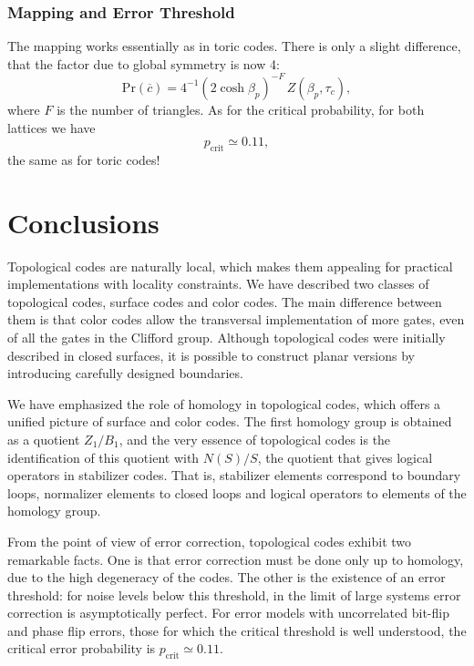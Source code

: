 \documentclass{article}
\newcommand{\prob}[1]{\mathrm{Pr}(#1)}
\begin{document}
\subsubsection{Mapping and Error Threshold}

The mapping works essentially as in toric codes. There is only a slight difference, that the factor due to global symmetry is now 4:
\begin{equation}\label{probability_partition_color}
\prob{\overline c}= 4^{-1} (2\cosh \beta_p)^{-F}\,Z(\beta_p,\tau_c),
\end{equation}
where $F$ is the number of triangles. As for the critical probability, for both lattices we have
\begin{equation}\label{}
p_\mathrm{crit}\simeq 0.11,
\end{equation}
the same as for toric codes!


\section{Conclusions}

Topological codes are naturally local, which makes them appealing for practical implementations with locality constraints. We have described two classes of topological codes, surface codes and color codes. The main difference between them is that color codes allow the transversal implementation of more gates, even of all the gates in the Clifford group. Although topological codes were initially described in closed surfaces, it is possible to construct planar versions by introducing carefully designed boundaries.

We have emphasized the role of homology in topological codes, which offers a unified picture of surface and color codes. The first homology group is obtained as a quotient $Z_1/B_1$, and the very essence of topological codes is the identification of this quotient with $N(S)/S$, the quotient that gives logical operators in stabilizer codes. That is, stabilizer elements correspond to boundary loops, normalizer elements to closed loops and logical operators to elements of the homology group.

From the point of view of error correction, topological codes exhibit two remarkable facts. One is that error correction must be done only up to homology, due to the high degeneracy of the codes. The other is the existence of an error threshold: for noise levels below this threshold, in the limit of large systems error correction is asymptotically perfect. For error models with uncorrelated bit-flip and phase flip errors, those for which the critical threshold is well understood, the critical error probability is $p_\mathrm{crit}\simeq 0.11$.
\end{document}
